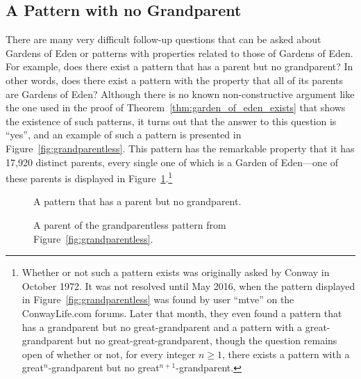 \subsection{A Pattern with no Grandparent}\label{sec:no_grandparent}

There are many very difficult follow-up questions that can be asked about Gardens of Eden or patterns with properties related to those of Gardens of Eden. For example, does there exist a pattern that has a parent but no grandparent? In other words, does there exist a pattern with the property that all of its parents are Gardens of Eden? Although there is no known non-constructive argument like the one used in the proof of Theorem~\ref{thm:garden_of_eden_exists} that shows the existence of such patterns, it turns out that the answer to this question is ``yes'', and an example of such a pattern is presented in Figure~\ref{fig:grandparentless}. This pattern has the remarkable property that it has 17,920 distinct parents, every single one of which is a Garden of Eden---one of these parents is displayed in Figure~\ref{fig:grandparentless_parent}.\footnote{Whether or not such a pattern exists was originally asked by Conway in October 1972. It was not resolved until May 2016, when the pattern displayed in Figure~\ref{fig:grandparentless} was found by user ``mtve'' on the ConwayLife.com forums. Later that month, they even found a pattern that has a grandparent but no great-grandparent and a pattern with a great-grandparent but no great-great-grandparent, though the question remains open of whether or not, for every integer $n \geq 1$, there exists a pattern with a great$^n$-grandparent but no great$^{n+1}$-grandparent.}

\begin{figure}[!htb]
	\centering
	\begin{minipage}[b]{.48\textwidth}
		\centering\vspace*{0.11cm}
		\caption{A pattern that has a parent but no grandparent.}\label{fig:grandparentless}
	\end{minipage} \quad %
	\begin{minipage}[b]{.48\textwidth}
		\centering
		\caption{A parent of the grandparentless pattern from Figure~\ref{fig:grandparentless}.}\label{fig:grandparentless_parent}
	\end{minipage}
\end{figure}


